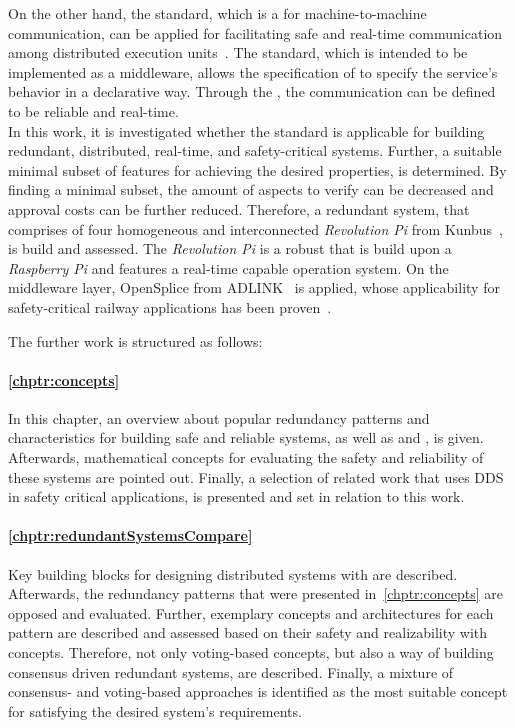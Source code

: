 On the other hand, the  standard, which is a  for machine-to-machine communication, can be applied for facilitating safe and real-time communication among distributed execution units~\cite{DistributedSafety2020}.
The standard, which is intended to be implemented as a middleware, allows the specification of  to specify the service's behavior in a declarative way.
Through the , the communication can be defined to be reliable and real-time.
\\

In this work, it is investigated whether the  standard is applicable for building redundant, distributed, real-time, and safety-critical systems.
Further, a suitable minimal subset of  features for achieving the desired properties, is determined.
By finding a minimal subset, the amount of aspects to verify can be decreased and approval costs can be further reduced.
Therefore, a redundant system, that comprises of four homogeneous and interconnected \textit{Revolution Pi} from Kunbus~\cite{Kunbus}, is build and assessed.
The \textit{Revolution Pi} is a robust  that is build upon a \textit{Raspberry Pi} and features a real-time capable operation system.
On the middleware layer, OpenSplice  from ADLINK~\cite{VortexOpenSplice} is applied, whose applicability for safety-critical railway applications has been proven~\cite{SchmidtMissionCriticalChallenges}.

The further work is structured as follows:

\paragraph{\autoref{chptr:concepts}}
In this chapter, an overview about popular redundancy patterns and characteristics for building safe and reliable systems, as well as  and , is given.
Afterwards, mathematical concepts for evaluating the safety and reliability of these systems are pointed out.
Finally, a selection of related work that uses \gls{DDS} in safety critical applications, is presented and set in relation to this work.

\paragraph{\autoref{chptr:redundantSystemsCompare}}
Key building blocks for designing distributed systems with  are described.
Afterwards, the redundancy patterns that were presented in~\autoref{chptr:concepts} are opposed and evaluated.
Further, exemplary concepts and architectures for each pattern are described and assessed based on their safety and realizability with  concepts.
Therefore, not only voting-based concepts, but also a way of building consensus driven redundant systems, are described.
Finally, a mixture of consensus- and voting-based approaches is identified as the most suitable concept for satisfying the desired system's requirements.

